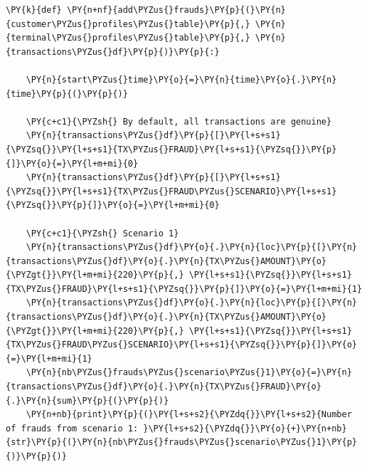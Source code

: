     \begin{tcolorbox}[breakable, size=fbox, boxrule=1pt, pad at break*=1mm,colback=cellbackground, colframe=cellborder]
\begin{Verbatim}[commandchars=\\\{\}]
\PY{k}{def} \PY{n+nf}{add\PYZus{}frauds}\PY{p}{(}\PY{n}{customer\PYZus{}profiles\PYZus{}table}\PY{p}{,} \PY{n}{terminal\PYZus{}profiles\PYZus{}table}\PY{p}{,} \PY{n}{transactions\PYZus{}df}\PY{p}{)}\PY{p}{:}

    \PY{n}{start\PYZus{}time}\PY{o}{=}\PY{n}{time}\PY{o}{.}\PY{n}{time}\PY{p}{(}\PY{p}{)}

    \PY{c+c1}{\PYZsh{} By default, all transactions are genuine}
    \PY{n}{transactions\PYZus{}df}\PY{p}{[}\PY{l+s+s1}{\PYZsq{}}\PY{l+s+s1}{TX\PYZus{}FRAUD}\PY{l+s+s1}{\PYZsq{}}\PY{p}{]}\PY{o}{=}\PY{l+m+mi}{0}
    \PY{n}{transactions\PYZus{}df}\PY{p}{[}\PY{l+s+s1}{\PYZsq{}}\PY{l+s+s1}{TX\PYZus{}FRAUD\PYZus{}SCENARIO}\PY{l+s+s1}{\PYZsq{}}\PY{p}{]}\PY{o}{=}\PY{l+m+mi}{0}

    \PY{c+c1}{\PYZsh{} Scenario 1}
    \PY{n}{transactions\PYZus{}df}\PY{o}{.}\PY{n}{loc}\PY{p}{[}\PY{n}{transactions\PYZus{}df}\PY{o}{.}\PY{n}{TX\PYZus{}AMOUNT}\PY{o}{\PYZgt{}}\PY{l+m+mi}{220}\PY{p}{,} \PY{l+s+s1}{\PYZsq{}}\PY{l+s+s1}{TX\PYZus{}FRAUD}\PY{l+s+s1}{\PYZsq{}}\PY{p}{]}\PY{o}{=}\PY{l+m+mi}{1}
    \PY{n}{transactions\PYZus{}df}\PY{o}{.}\PY{n}{loc}\PY{p}{[}\PY{n}{transactions\PYZus{}df}\PY{o}{.}\PY{n}{TX\PYZus{}AMOUNT}\PY{o}{\PYZgt{}}\PY{l+m+mi}{220}\PY{p}{,} \PY{l+s+s1}{\PYZsq{}}\PY{l+s+s1}{TX\PYZus{}FRAUD\PYZus{}SCENARIO}\PY{l+s+s1}{\PYZsq{}}\PY{p}{]}\PY{o}{=}\PY{l+m+mi}{1}
    \PY{n}{nb\PYZus{}frauds\PYZus{}scenario\PYZus{}1}\PY{o}{=}\PY{n}{transactions\PYZus{}df}\PY{o}{.}\PY{n}{TX\PYZus{}FRAUD}\PY{o}{.}\PY{n}{sum}\PY{p}{(}\PY{p}{)}
    \PY{n+nb}{print}\PY{p}{(}\PY{l+s+s2}{\PYZdq{}}\PY{l+s+s2}{Number of frauds from scenario 1: }\PY{l+s+s2}{\PYZdq{}}\PY{o}{+}\PY{n+nb}{str}\PY{p}{(}\PY{n}{nb\PYZus{}frauds\PYZus{}scenario\PYZus{}1}\PY{p}{)}\PY{p}{)}


\end{Verbatim}
\end{tcolorbox}
